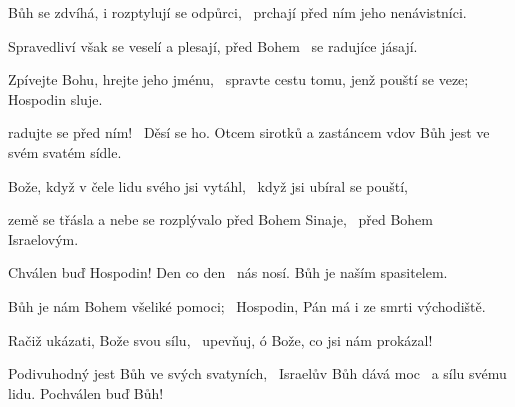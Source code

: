 \begin{psalmus}
 
Bůh se zdvíhá, i rozptylují se odpůrci,~\grestar{}
prchají před ním jeho nenávistníci.~\Abardot{}

Spravedliví však se veselí a plesají, před Bohem~\grestar{}
se radujíce jásají.~\Abardot{}

Zpívejte Bohu, hrejte jeho jménu,~\grestar{}
spravte cestu tomu, jenž pouští se veze; Hospodin sluje.~\Abardot{}

radujte se před ním!~\grestar{}
Děsí se ho. Otcem sirotků a zastáncem vdov Bůh jest ve svém svatém sídle.~\Abardot{}

Bože, když v čele lidu svého jsi vytáhl,~\grestar{}
když jsi ubíral se pouští,~\Abardot{}

země se třásla a nebe se rozplývalo před Bohem Sinaje,~\grestar{}
před Bohem Israelovým.~\Abardot{}

Chválen buď Hospodin! Den co den~\grestar{}
nás nosí. Bůh je naším spasitelem.~\Abardot{}

Bůh je nám Bohem všeliké pomoci;~\grestar{}
Hospodin, Pán má i ze smrti východiště.~\Abardot{}

Račiž ukázati, Bože svou sílu,~\grestar{}
upevňuj, ó Bože, co jsi nám prokázal!~\Abardot{}

Podivuhodný jest Bůh ve svých svatyních,~\gredagger{}
Israelův Bůh dává moc~\grestar{}
a sílu svému lidu. Pochválen buď Bůh!~\Abardot{}
\end{psalmus}
